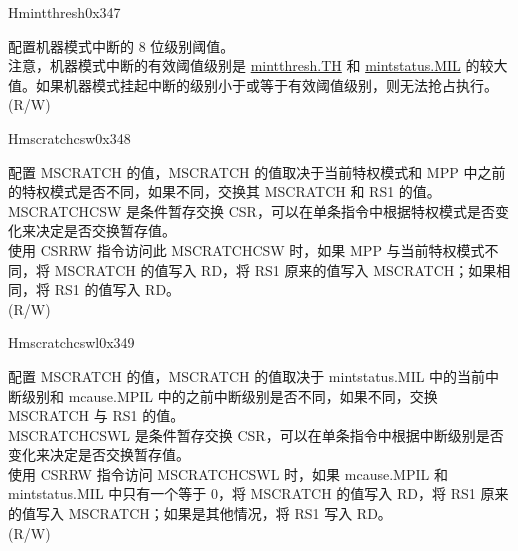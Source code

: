 \begin{register}{H}{mintthresh}{0x347}\label{regdesc:MINTTHRESH}
%
%
\regnewline%
\begin{regdesc}\begin{reglist}
\label{fielddesc:MINTTHRESH_TH}\item [TH] 配置机器模式中断的 8 位级别阈值。 \\
注意，机器模式中断的有效阈值级别是 \hyperref[fielddesc:MINTTHRESH_TH]{{mintthresh.TH}} 和 \hyperref[fielddesc:MINTSTATUS_MIL]{{mintstatus.MIL}} 的较大值。如果机器模式挂起中断的级别小于或等于有效阈值级别，则无法抢占执行。\\(R/W)
\end{reglist}\end{regdesc}
\end{register}


\begin{register}{H}{mscratchcsw}{0x348}\label{regdesc:MSCRATCHCSW_REG}
%
\regnewline%
\begin{regdesc}\begin{reglist}
\label{fielddesc:MSCRATCHCSW}\item [MSCRATCHCSW] 配置 MSCRATCH 的值，MSCRATCH 的值取决于当前特权模式和 MPP 中之前的特权模式是否不同，如果不同，交换其 MSCRATCH 和 RS1 的值。\\
MSCRATCHCSW 是条件暂存交换 CSR，可以在单条指令中根据特权模式是否变化来决定是否交换暂存值。\\
使用 CSRRW 指令访问此 MSCRATCHCSW 时，如果 MPP 与当前特权模式不同，将 MSCRATCH 的值写入 RD，将 RS1 原来的值写入 MSCRATCH；如果相同，将 RS1 的值写入 RD。\\
(R/W)
\end{reglist}\end{regdesc}
\end{register}

\begin{register}{H}{mscratchcswl}{0x349}\label{regdesc:MSCRATCHCSWL_REG}
%
\regnewline%
\begin{regdesc}\begin{reglist}
\label{fielddesc:MSCRATCHCSWL}\item [MSCRATCHCSWL] 配置 MSCRATCH 的值，MSCRATCH 的值取决于 mintstatus.MIL 中的当前中断级别和 mcause.MPIL 中的之前中断级别是否不同，如果不同，交换 MSCRATCH 与 RS1 的值。\\
MSCRATCHCSWL 是条件暂存交换 CSR，可以在单条指令中根据中断级别是否变化来决定是否交换暂存值。\\
使用 CSRRW 指令访问 MSCRATCHCSWL 时，如果 mcause.MPIL 和 mintstatus.MIL 中只有一个等于 0，将 MSCRATCH 的值写入 RD，将 RS1 原来的值写入 MSCRATCH；如果是其他情况，将 RS1 写入 RD。\\
(R/W)
\end{reglist}\end{regdesc}
\end{register}

